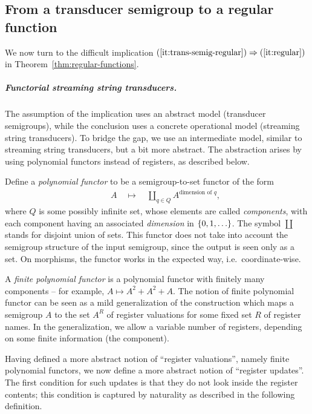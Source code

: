 \subsection{From a transducer semigroup to a regular function}
\label{sec:hard}
We now turn to the difficult implication $(\ref{it:trans-semig-regular}) \Rightarrow (\ref{it:regular})$ in Theorem~\ref{thm:regular-functions}. 

\subparagraph*{Functorial streaming string transducers.}
\label{sec:abstract-sst} 
The assumption of the implication uses an abstract model (transducer semigroups), while the conclusion uses a concrete operational model (streaming string transducers). To bridge the gap, we use an intermediate model, similar to streaming string transducers, but a bit more abstract. The abstraction arises by using polynomial functors instead of registers, as described below. 

Define a \emph{polynomial functor} to be a semigroup-to-set functor of the form
\begin{align*}
\qquad A \quad \mapsto \quad \coprod_{q \in Q} A^{\text{dimension of } q},
\end{align*}
where $Q$ is some possibly infinite set, whose elements are called \emph{components}, with each  component having an associated \emph{dimension} in $\{0,1,\ldots\}$. The symbol $\coprod$ stands for disjoint union of sets. This functor does not take into account the semigroup structure of the input semigroup, since the output is seen only as a set.
On morphisms, the functor works in the expected way, i.e.~coordinate-wise.  

A \emph{finite polynomial functor} is a polynomial functor with finitely many components -- for example, $A \mapsto A^2 + A^2 + A$. 
The notion of finite polynomial functor can be seen as a mild generalization of the construction which maps a semigroup $A$ to the set $A^R$ of register valuations for some fixed set $R$ of register names.  In the generalization, we allow a variable number of registers, depending on some finite information (the component). 

Having defined a more abstract notion of ``register valuations'', namely finite polynomial functors, we now define a more abstract notion of ``register updates''.  The first condition for such updates is that they do not look inside the register contents; this condition is captured by naturality as described in the following definition. 



